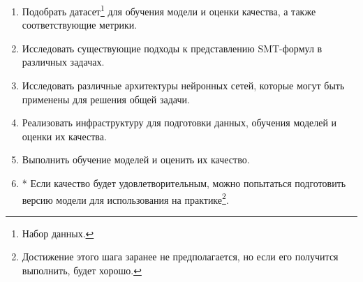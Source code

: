 \begin{enumerate}
    \item Подобрать датасет\footnote{Набор данных.} для обучения модели и оценки качества, а также соответствующие метрики.
    \item Исследовать существующие подходы к представлению SMT-формул в различных задачах.
    \item Исследовать различные архитектуры нейронных сетей, которые могут быть применены для решения общей задачи.
    \item Реализовать инфраструктуру для подготовки данных, обучения моделей и оценки их качества.
    \item Выполнить обучение моделей и оценить их качество.
    \item * Если качество будет удовлетворительным, можно попытаться подготовить версию модели для использования на практике\footnote{Достижение этого шага заранее не предполагается, но если его получится выполнить, будет хорошо.}.
\end{enumerate}

